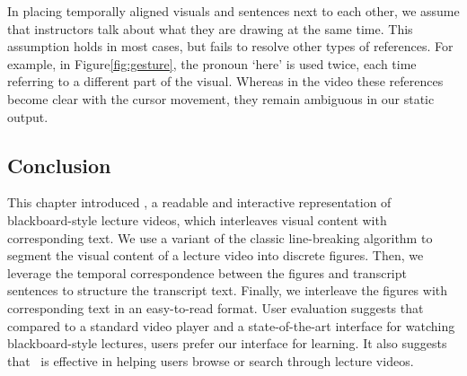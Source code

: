 In placing temporally aligned visuals and sentences next to each other, we assume that instructors talk about what they are drawing at the same time. This assumption holds in most cases, but fails to resolve other types of references. For example, in Figure\ref{fig:gesture}, the pronoun `here' is used twice, each time referring to a different part of the visual. Whereas in the video these references become clear with the cursor movement, they remain ambiguous in our static output.



\subsection{Conclusion}
This chapter introduced \systemname , a readable and interactive representation of blackboard-style lecture videos, which interleaves visual content with corresponding text. We use a variant of the classic line-breaking algorithm to segment the visual content of a lecture video into discrete figures. Then, we leverage the temporal correspondence between the figures and transcript sentences to structure the transcript text. Finally, we interleave the figures with corresponding text in an easy-to-read format. User evaluation suggests that compared to a standard video player and a state-of-the-art interface for watching blackboard-style lectures, users prefer our interface for learning. It also suggests that \systemname\ is effective in helping users browse or search through lecture videos. 

